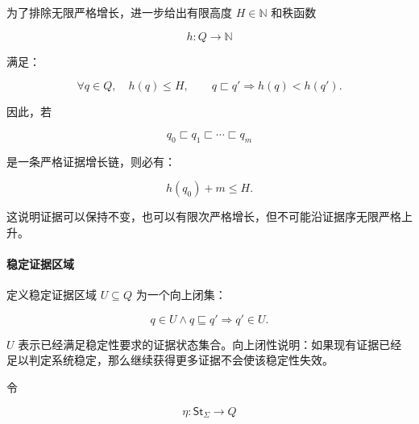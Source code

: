   为了排除无限严格增长，进一步给出有限高度 $H\in\mathbb N$ 和秩函数

  \begin{equation}
    \boxed{
      h:Q\longrightarrow\mathbb N
    }
    \label{eq:feedback-rank-function}
  \end{equation}

  满足：

  \begin{equation}
    \boxed{
      \forall q\in Q,\quad h(q)\le H,
      \qquad
      q\sqsubset q'
      \Longrightarrow
      h(q)<h(q').
    }
    \label{eq:feedback-finite-height}
  \end{equation}

  因此，若

  \begin{equation}
    \boxed{
      q_0\sqsubset q_1\sqsubset\cdots\sqsubset q_m}
    \label{eq:feedback-strict-evidence-chain}
  \end{equation}

  是一条严格证据增长链，则必有：

  \begin{equation}
    \boxed{
      h(q_0)+m\le H.
    }
    \label{eq:feedback-strict-chain-bound}
  \end{equation}

  这说明证据可以保持不变，也可以有限次严格增长，但不可能沿证据序无限严格上升。

  \paragraph{稳定证据区域}

  定义稳定证据区域 $U\subseteq Q$ 为一个向上闭集：

  \begin{equation}
    \boxed{
      q\in U
      \land
      q\sqsubseteq q'
      \Longrightarrow
      q'\in U.
    }
    \label{eq:feedback-stable-upset}
  \end{equation}

  $U$ 表示已经满足稳定性要求的证据状态集合。向上闭性说明：如果现有证据已经足以判定系统稳定，那么继续获得更多证据不会使该稳定性失效。

  令

  \begin{equation}
    \boxed{
      \eta:
      \mathsf{St}_{\Sigma}
      \longrightarrow
      Q
    }
    \label{eq:feedback-state-evidence-map}
  \end{equation}


